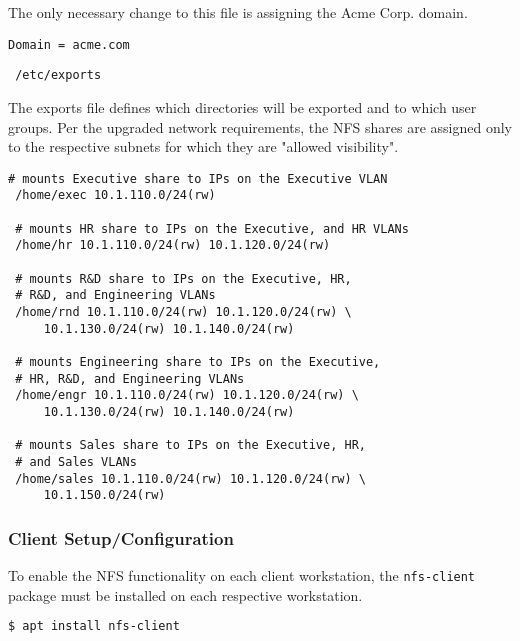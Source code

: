 \noindent
The only necessary change to this file is assigning the Acme Corp. domain. \\

\begin{lstlisting}[backgroundcolor=\color{Gray}]
 Domain = acme.com
\end{lstlisting}

\begin{lstlisting}
 /etc/exports
\end{lstlisting}

\noindent
The exports file defines which directories will be exported and to which
user groups. Per the upgraded network requirements, the NFS shares are assigned 
only to the respective subnets for which they are "allowed visibility". \\

\begin{lstlisting}[backgroundcolor=\color{Gray}]
 # mounts Executive share to IPs on the Executive VLAN
 /home/exec 10.1.110.0/24(rw)

 # mounts HR share to IPs on the Executive, and HR VLANs
 /home/hr 10.1.110.0/24(rw) 10.1.120.0/24(rw)

 # mounts R&D share to IPs on the Executive, HR, 
 # R&D, and Engineering VLANs
 /home/rnd 10.1.110.0/24(rw) 10.1.120.0/24(rw) \
     10.1.130.0/24(rw) 10.1.140.0/24(rw)

 # mounts Engineering share to IPs on the Executive, 
 # HR, R&D, and Engineering VLANs
 /home/engr 10.1.110.0/24(rw) 10.1.120.0/24(rw) \
     10.1.130.0/24(rw) 10.1.140.0/24(rw)

 # mounts Sales share to IPs on the Executive, HR, 
 # and Sales VLANs
 /home/sales 10.1.110.0/24(rw) 10.1.120.0/24(rw) \
     10.1.150.0/24(rw)
\end{lstlisting}

\subsubsection{Client Setup/Configuration}
To enable the NFS functionality on each client workstation, the
\lstinline$nfs-client$ package must be installed on each respective workstation.
\\

\begin{lstlisting}[backgroundcolor=\color{Gray}, language=bash]
 $ apt install nfs-client
\end{lstlisting}
\vspace{1em}

